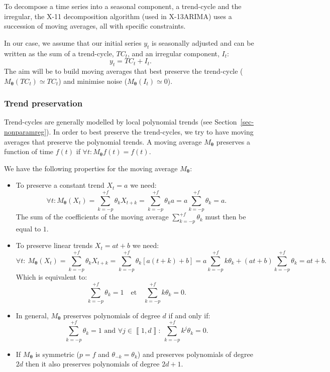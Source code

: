 \documentclass[
]{article}
\newcommand\1{\mathds{1}}
\begin{document}
To decompose a time series into a seasonal component, a trend-cycle and
the irregular, the X-11 decomposition algorithm (used in X-13ARIMA) uses
a succession of moving averages, all with specific constraints.

In our case, we assume that our initial series \(y_t\) is seasonally
adjusted and can be written as the sum of a trend-cycle, \(TC_t\), and
an irregular component, \(I_t\): \[
y_t=TC_t+I_t.
\] The aim will be to build moving averages that best preserve the
trend-cycle (\(M_{\boldsymbol\theta} (TC_t)\simeq TC_t\)) and minimise
noise (\(M_{\boldsymbol\theta} (I_t)\simeq 0\)).

\subsubsection{Trend preservation}\label{trend-preservation}

Trend-cycles are generally modelled by local polynomial trends (see
Section~\ref{sec-nonparamreg}). In order to best preserve the
trend-cycles, we try to have moving averages that preserve the
polynomial trends. A moving average \(M_{\boldsymbol\theta}\) preserves
a function of time \(f(t)\) if
\(\forall t:M_{\boldsymbol\theta} f(t)=f(t)\).

We have the following properties for the moving average
\(M_{\boldsymbol\theta}\):

\begin{itemize}
\item
  To preserve a constant trend \(X_t=a\) we need: \[
  \forall t:M_{\boldsymbol\theta}(X_t)=\sum_{k=-p}^{+f}\theta_kX_{t+k}=\sum_{k=-p}^{+f}\theta_ka=a\sum_{k=-p}^{+f}\theta_k=a.
  \] The sum of the coefficients of the moving average
  \(\sum_{k=-p}^{+f}\theta_k\) must then be equal to \(1\).
\item
  To preserve linear trends \(X_t=at+b\) we need: \[
  \forall t:\:M_{\boldsymbol\theta}(X_t)=\sum_{k=-p}^{+f}\theta_kX_{t+k}=\sum_{k=-p}^{+f}\theta_k[a(t+k)+b]=a\sum_{k=-p}^{+f}k\theta_k+(at+b)\sum_{k=-p}^{+f}\theta_k=at+b.
  \] Which is equivalent to: \[
  \sum_{k=-p}^{+f}\theta_k=1
  \quad\text{et}\quad
  \sum_{k=-p}^{+f}k\theta_k=0.
  \]
\item
  In general, \(M_{\boldsymbol\theta}\) preserves polynomials of degree
  \(d\) if and only if: \[
  \sum_{k=-p}^{+f}\theta_k=1
   \text{ and }
  \forall j \in \left\llbracket 1,d\right\rrbracket:\:
  \sum_{k=-p}^{+f}k^j\theta_k=0.
  \]
\item
  If \(M_{\boldsymbol\theta}\) is symmetric (\(p=f\) and
  \(\theta_{-k} = \theta_k\)) and preserves polynomials of degree \(2d\)
  then it also preserves polynomials of degree \(2d+1\).
\end{itemize}
\end{document}
